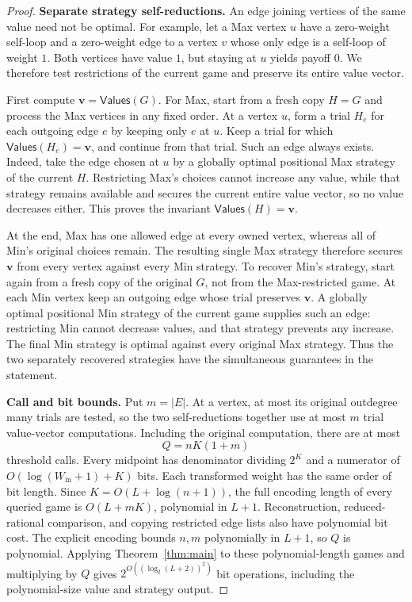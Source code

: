 \begin{proof}
\par\medskip\noindent\textbf{Separate strategy self-reductions.}\enspace
An edge joining vertices of the same value need not be optimal.
For example, let a Max vertex $u$ have a zero-weight self-loop and a
zero-weight edge to a vertex $v$ whose only edge is a self-loop of
weight $1$. Both vertices have value $1$, but staying at $u$ yields
payoff $0$. We therefore test restrictions of the current game and
preserve its entire value vector.

First compute $\mathbf v=\mathsf{Values}(G)$. For Max, start from a
fresh copy $H=G$ and process the Max vertices in any fixed order.
At a vertex $u$, form a trial $H_e$ for each outgoing edge $e$ by
keeping only $e$ at $u$. Keep a trial for which
$\mathsf{Values}(H_e)=\mathbf v$, and continue from that trial.
Such an edge always exists. Indeed, take the edge chosen at $u$ by a
globally optimal positional Max strategy of the current $H$.
Restricting Max's choices cannot increase any value, while that
strategy remains available and secures the current entire value
vector, so no value decreases either. This proves the invariant
$\mathsf{Values}(H)=\mathbf v$.

At the end, Max has one allowed edge at every owned vertex, whereas
all of Min's original choices remain. The resulting single Max
strategy therefore secures $\mathbf v$ from every vertex against
every Min strategy. To recover Min's strategy, start again from a
fresh copy of the original $G$, not from the Max-restricted game.
At each Min vertex keep an outgoing edge whose trial preserves
$\mathbf v$. A globally optimal positional Min strategy of the
current game supplies such an edge: restricting Min cannot decrease
values, and that strategy prevents any increase. The final Min
strategy is optimal against every original Max strategy. Thus the two
separately recovered strategies have the simultaneous guarantees in
the statement.

\par\medskip\noindent\textbf{Call and bit bounds.}\enspace
Put $m=|E|$. At a vertex, at most its original outdegree many trials
are tested, so the two self-reductions together use at most $m$ trial
value-vector computations. Including the original computation, there
are at most
\begin{equation}
 Q=nK(1+m)
 \label{eq:threshold-call-bound}
\end{equation}
threshold calls. Every midpoint has denominator dividing $2^K$ and
a numerator of $O(\log(W_{\mathrm{in}}+1)+K)$ bits. Each transformed
weight has the same order of bit length. Since
$K=O(L+\log(n+1))$, the full encoding length of every queried game
is $O(L+mK)$, polynomial in $L+1$. Reconstruction, reduced-rational
comparison, and copying restricted edge lists also have polynomial
bit cost. The explicit encoding bounds $n,m$ polynomially in $L+1$,
so $Q$ is polynomial. Applying Theorem~\ref{thm:main} to these
polynomial-length games and multiplying by $Q$ gives
$2^{O((\log_2(L+2))^2)}$ bit operations, including the polynomial-size
value and strategy output.
\end{proof}

